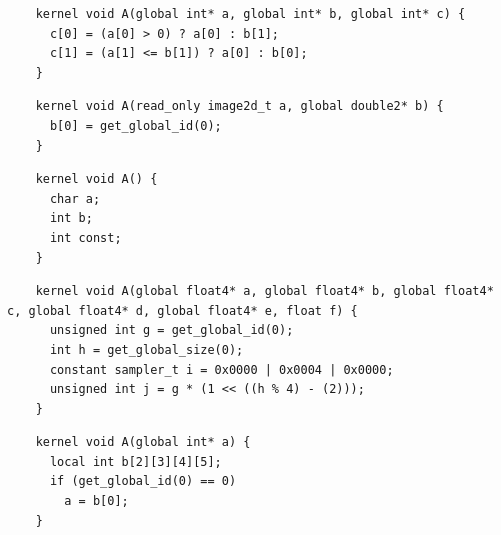 \newsavebox{\BeignetTernarySmaller}
\begin{lrbox}{\BeignetTernarySmaller}
  \hspace{1.5em}
  \begin{lstlisting}
    kernel void A(global int* a, global int* b, global int* c) {
      c[0] = (a[0] > 0) ? a[0] : b[1];
      c[1] = (a[1] <= b[1]) ? a[0] : b[0];
    }
  \end{lstlisting}
\end{lrbox}

\newsavebox{\IntelGtDoubleAssertion}
\begin{lrbox}{\IntelGtDoubleAssertion}
  \hspace{1.5em}
  \begin{lstlisting}
    kernel void A(read_only image2d_t a, global double2* b) {
      b[0] = get_global_id(0);
    }
  \end{lstlisting}
\end{lrbox}

\newsavebox{\IntelDeclDoesntDeclareAnything}
\begin{lrbox}{\IntelDeclDoesntDeclareAnything}
  \hspace{1.5em}
  \begin{lstlisting}
    kernel void A() {
      char a;
      int b;
      int const;
    }
  \end{lstlisting}
\end{lrbox}

\newsavebox{\AddressQualifiedAutoVar}
\begin{lrbox}{\AddressQualifiedAutoVar}
  \hspace{1.5em}
  \begin{lstlisting}
    kernel void A(global float4* a, global float4* b, global float4* c, global float4* d, global float4* e, float f) {
      unsigned int g = get_global_id(0);
      int h = get_global_size(0);
      constant sampler_t i = 0x0000 | 0x0004 | 0x0000;
      unsigned int j = g * (1 << ((h % 4) - (2)));
    }
  \end{lstlisting}
\end{lrbox}

\newsavebox{\NvidiaLocalGlobalSegfault}
\begin{lrbox}{\NvidiaLocalGlobalSegfault}
  \hspace{1.5em}
  \begin{lstlisting}
    kernel void A(global int* a) {
      local int b[2][3][4][5];
      if (get_global_id(0) == 0)
        a = b[0];
    }
  \end{lstlisting}
\end{lrbox}

